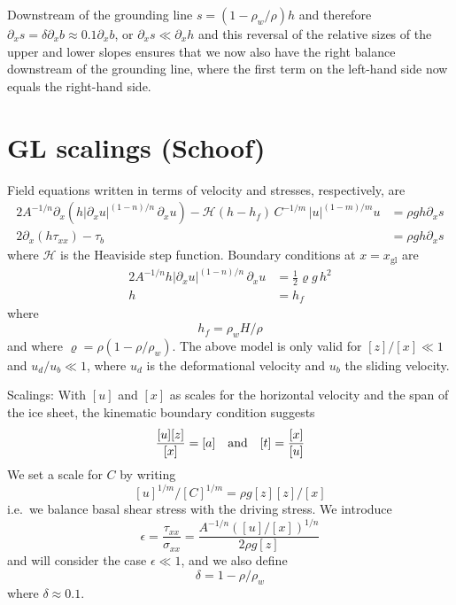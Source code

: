 \documentclass[10pt,a4paper]{book}
\newcommand{\He}{\mathcal{H}}
\newcommand{\p}{\partial}
\newcommand{\txx}{\tau_{xx}}
\newcommand{\sxx}{\sigma_{xx}}
\newcommand{\xgl}{x_{\mathrm{gl}}}
\begin{document}
Downstream of the grounding line $s=(1-\rho_w/\rho) h$ and therefore
$\p_x s = \delta \p_x b \approx 0.1 \p_x b$, or
$\p_x s \ll \p_x h $ and this reversal of the relative sizes of the upper
and lower slopes ensures that we now also have the right balance
downstream of the grounding line, where the first term on the left-hand side now equals the right-hand side.




\section{GL scalings  (Schoof)}

\setcounter{equation}{0}
Field equations written in terms of velocity and stresses, respectively, are
\begin{align}
2 A^{-1/n} \p_x \left (h |\p_x u|^{(1-n)/n} \, \p_x u \right ) - \He(h-h_f) \, C^{-1/m} \, |u|^{(1-m)/m} u & = \rho g h \p_x s  \label{eq:vel}\\
     2 \p_x \left ( h \txx \right )  - \tau_b & = \rho g h \p_x s  \label{eq:stress} 
\end{align}
where $\He$ is the Heaviside step function.
Boundary conditions at $x=\xgl$ are
\begin{align}
2 A^{-1/n} h |\p_x u|^{(1-n)/n}   \, \p_x u & = \frac{1}{2} \varrho g \, h^2  \label{eq:bc1c} \\
h&=h_f   \label{eq:bc2c}
\end{align}
where
\[
h_f=\rho_w H/\rho
\]
and where $\varrho=\rho (1-\rho/\rho_w)$. The above model is only valid for $[z]/[x] \ll 1 $
and $u_d/u_b\ll 1$, where $u_d$ is the deformational velocity and
$u_b$ the sliding velocity.


Scalings: With $[u]$ and $[x]$ as scales for the horizontal velocity
and the span of the ice sheet, the kinematic boundary condition suggests
\[
\frac{[u] [z]}{[x]}= [a] \quad \hbox{and} \quad [t]=\frac{[x]}{[u]}
\]
We set a scale for $C$ by writing
\[
[u]^{1/m}/[C]^{1/m}=\rho g [z] [z]/[x]
\]
i.e.\ we balance basal shear stress with the driving stress.
We introduce
\begin{equation}
  \epsilon=\frac{\txx}{\sxx} = \frac{A^{-1/n} ([u]/[x])^{1/n}}{2 \rho g [z]} 
\end{equation}
and will consider the case $\epsilon \ll 1$, and we also define
\begin{equation}
  \delta=1-\rho/\rho_w  
\end{equation}
where $\delta\approx 0.1$.
\end{document}
